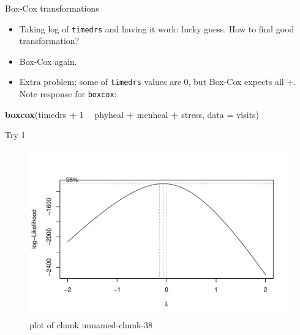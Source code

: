 \documentclass[ignorenonframetext,]{beamer}
\newenvironment{Shaded}{\begin{snugshade}}{\end{snugshade}}
\newcommand{\DataTypeTok}[1]{\textcolor[rgb]{0.13,0.29,0.53}{#1}}
\newcommand{\DecValTok}[1]{\textcolor[rgb]{0.00,0.00,0.81}{#1}}
\newcommand{\KeywordTok}[1]{\textcolor[rgb]{0.13,0.29,0.53}{\textbf{#1}}}
\newcommand{\NormalTok}[1]{#1}
\newcommand{\OperatorTok}[1]{\textcolor[rgb]{0.81,0.36,0.00}{\textbf{#1}}}
\newcommand{\StringTok}[1]{\textcolor[rgb]{0.31,0.60,0.02}{#1}}
\begin{document}
\begin{frame}[fragile]{Box-Cox transformations}
\protect\hypertarget{box-cox-transformations}{}

\begin{itemize}
\item
  Taking log of \texttt{timedrs} and having it work: lucky guess. How to
  find good transformation?
\item
  Box-Cox again.
\item
  Extra problem: some of \texttt{timedrs} values are 0, but Box-Cox
  expects all +. Note response for \texttt{boxcox}:
\end{itemize}

\begin{Shaded}
\begin{Highlighting}[]
\KeywordTok{boxcox}\NormalTok{(timedrs }\OperatorTok{+}\StringTok{ }\DecValTok{1} \OperatorTok{~}\StringTok{ }\NormalTok{phyheal }\OperatorTok{+}\StringTok{ }\NormalTok{menheal }\OperatorTok{+}\StringTok{ }\NormalTok{stress, }\DataTypeTok{data =}\NormalTok{ visits)}
\end{Highlighting}
\end{Shaded}

\end{frame}

\begin{frame}{Try 1}
\protect\hypertarget{try-1}{}

\begin{figure}
\centering
\includegraphics{figure/unnamed-chunk-38-1.pdf}
\caption{plot of chunk unnamed-chunk-38}
\end{figure}

\end{frame}
\end{document}
